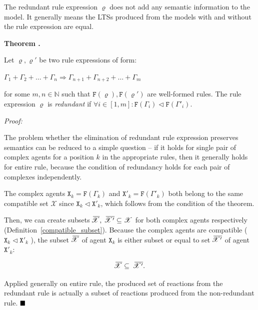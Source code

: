 \documentclass[12pt, twoside]{fithesis2} %
\newcounter{counter}[section]
\renewcommand{\thecounter}{\thesection.\arabic{counter}}
\newenvironment{proof}{\noindent\emph{Proof:~ }\nopagebreak \begin{itshape}}{\end{itshape}\bigskip}
\newenvironment{theorem}{\bigskip\refstepcounter{counter}\noindent\textbf{Theorem \thecounter }\nopagebreak \begin{itshape}}{\end{itshape}\medskip}
\newcommand*{\QEDA}{\hfill\ensuremath{\blacksquare}}%
\begin{document}
The redundant rule expression $\varrho$ does not add any semantic information to the model. It generally means the LTSs produced from the models with and without the rule expression are equal.

\begin{theorem}
\label{redundant_if}
Let $\varrho, \varrho'$ be two rule expressions of form:
\begin{center}
$ \Gamma_1 + \Gamma_2 + \ldots + \Gamma_n \Rightarrow \Gamma_{n+1} + \Gamma_{n+2} + \ldots + \Gamma_{m} $
\end{center}

for some $m,n \in \mathbb{N}$ such that $\mathtt{F}(\varrho), \mathtt{F}(\varrho')$ are well-formed rules. The rule expression $\varrho$ is \emph{redundant} if $ \forall i \in [ 1, m ]: \mathtt{F}(\Gamma_i) \lhd \mathtt{F}(\Gamma'_i). $
\end{theorem}

\begin{proof}
The problem whether the elimination of redundant rule expression preserves semantics can be reduced to a simple question -- if it holds for single pair of complex agents for a position $k$ in the appropriate rules, then it generally holds for entire rule, because the condition of redundancy holds for each pair of complexes independently.

The complex agents $\mathtt{X}_k = \mathtt{F}(\Gamma_k)$ and $\mathtt{X}'_k = \mathtt{F}(\Gamma'_k)$ both belong to the same compatible set $\mathscr{X}$ since $\mathtt{X}_k \lhd \mathtt{X}'_k$, which follows from the condition of the theorem. 

Then, we can create subsets $\mkern2mu\overline{\mkern-4.5mu \mathscr{X}},~ \mkern2mu\overline{\mkern-4.5mu \mathscr{X}'} \subseteq \mathscr{X}$ for both complex agents respectively (Definition~\ref{compatible_subset}). Because the complex agents are compatible ($\mathtt{X}_k \lhd \mathtt{X}'_k$ ), the subset $\mkern2mu\overline{\mkern-4.5mu \mathscr{X}}$ of agent $\mathtt{X}_k$ is either subset or equal to set $\mkern2mu\overline{\mkern-4.5mu \mathscr{X}'}$ of agent $\mathtt{X}'_k$:

$$\mkern2mu\overline{\mkern-4.5mu \mathscr{X}} \subseteq ~\mkern2mu\overline{\mkern-4.5mu \mathscr{X}'}.$$

Applied generally on entire rule, the produced set of reactions from the redundant rule is actually a subset of reactions produced from the non-redundant rule. $\QEDA$
\end{proof}
\end{document}
